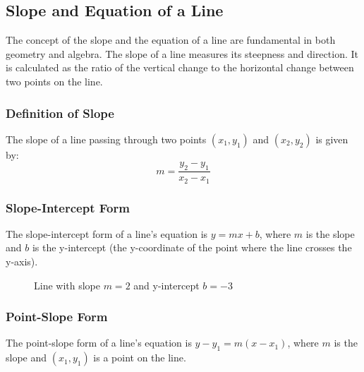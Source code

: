\documentclass[a4paper,12pt]{book}
\newcounter{problem}
\begin{document}



\subsection{Slope and Equation of a Line}
\label{subsec:slope_and_equation_of_line}
The concept of the slope and the equation of a line are fundamental in both geometry and algebra. The slope of a line measures its steepness and direction. It is calculated as the ratio of the vertical change to the horizontal change between two points on the line.

\subsubsection{Definition of Slope}
The slope of a line passing through two points \( (x_1, y_1) \) and \( (x_2, y_2) \) is given by:
\[
m = \frac{y_2 - y_1}{x_2 - x_1}
\]

\subsubsection{Slope-Intercept Form}
The slope-intercept form of a line's equation is \( y = mx + b \), where \( m \) is the slope and \( b \) is the y-intercept (the y-coordinate of the point where the line crosses the y-axis).

\begin{figure}[H]
\centering
{}
\caption{Line with slope \( m = 2 \) and y-intercept \( b = -3 \)}
\end{figure}

\subsubsection{Point-Slope Form}
The point-slope form of a line's equation is \( y - y_1 = m(x - x_1) \), where \( m \) is the slope and \( (x_1, y_1) \) is a point on the line.
\end{document}
